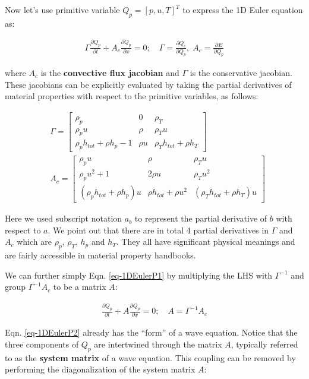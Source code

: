 \documentclass[12pt, letterpaper]{report}
\begin{document}
Now let's use primitive variable $Q_p = [p, u, T]^T$ to express the 1D Euler equation as:

\begin{align}\label{eq-1DEulerP1}
   \Gamma \frac{\partial Q_p}{\partial t} + A_c \frac{\partial Q_p}{\partial x} = 0; \quad \Gamma =
   \frac{\partial Q_c}{\partial Q_p}, \; A_c = \frac{\partial E}{\partial Q_p}
\end{align}

where $A_c$ is the {\bf convective flux jacobian} and $\Gamma$ is the conservative jacobian. These
jacobians can be explicitly evaluated by taking the partial derivatives of material properties with
respect to the primitive variables, as follows:

\begin{align*}
   &\Gamma = \begin{bmatrix}
      \rho_p & 0 & \rho_T \\
      \rho_p u & \rho & \rho_T u \\
      \rho_p h_{tot} + \rho h_p - 1 & \rho u & \rho_T h_{tot} + \rho h_T
   \end{bmatrix} \\
   &A_c = \begin{bmatrix}
      \rho_p u & \rho & \rho_T u \\
      \rho_p u^2 + 1 & 2\rho u & \rho_T u^2 \\
      (\rho_p h_{tot} + \rho h_p)u & \rho h_{tot} + \rho u^2 & (\rho_T h_{tot} + \rho h_T)u
      \end{bmatrix}
\end{align*}

Here we used subscript notation $a_b$ to represent the partial derivative of $b$ with respect to
$a$. We point out that there are in total 4 partial derivatives in $\Gamma$ and $A_c$ which are
$\rho_p$, $\rho_T$, $h_p$ and $h_T$. They all have significant physical meanings and are fairly
accessible in material property handbooks.\paraspace

We can further simply Eqn. \ref{eq-1DEulerP1} by multiplying the LHS with $\Gamma^{-1}$ and group
$\Gamma^{-1}A_c$ to be a matrix $A$:

\begin{align}\label{eq-1DEulerP2}
   \frac{\partial Q_p}{\partial t} + A \frac{\partial Q_p}{\partial x} = 0; \quad A = \Gamma^{-1}A_c
\end{align}

Eqn. \ref{eq-1DEulerP2} already has the ``form'' of a wave equation. Notice that the three
components of $Q_p$ are intertwined through the matrix $A$, typically referred to as the {\bf
system matrix} of a wave equation. This coupling can be removed by performing the diagonalization of
the system matrix $A$:
\end{document}
